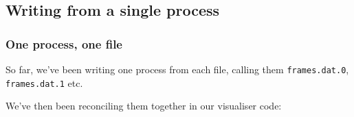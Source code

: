 \begin{Shaded}
\begin{Highlighting}[]

\end{Highlighting}
\end{Shaded}

\subsection{Writing from a single
process}\label{writing-from-a-single-process}

\subsubsection{One process, one file}\label{one-process-one-file}

So far, we've been writing one process from each file, calling them
\texttt{frames.dat.0}, \texttt{frames.dat.1} etc.

\begin{Shaded}
\begin{Highlighting}[]

   
\end{Highlighting}
\end{Shaded}

We've then been reconciling them together in our visualiser code:

\begin{Shaded}
\begin{Highlighting}[]

 
      \NormalTok{+ }

 
\end{Highlighting}
\end{Shaded}

\begin{Shaded}
\begin{Highlighting}[]

     
\end{Highlighting}
\end{Shaded}

